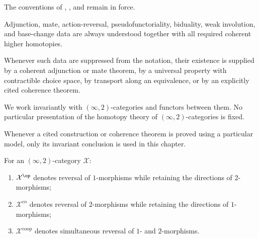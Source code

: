 The conventions of
,
,
and
remain in force.

\begin{convention}
\label{conv:rigid-morita-higher-coherence}
Adjunction, mate, action-reversal, pseudofunctoriality, biduality, weak
involution, and base-change data are always understood together with all
required coherent higher homotopies.

Whenever such data are suppressed from the notation, their existence is
supplied by a coherent adjunction or mate theorem, by a universal property
with contractible choice space, by transport along an equivalence, or by
an explicitly cited coherence theorem.
\end{convention}

\begin{convention}
\label{conv:infinity-two-variance}
We work invariantly with $(\infty,2)$-categories and functors between
them. No particular presentation of the homotopy theory of
$(\infty,2)$-categories is fixed.

Whenever a cited construction or coherence theorem is proved using a
particular model, only its invariant conclusion is used in this chapter.

For an $(\infty,2)$-category $\mathcal X$:
\begin{enumerate}[label=(\roman*)]
    \item $\mathcal X^{\op}$ denotes reversal of $1$-morphisms while
    retaining the directions of $2$-morphisms;

    \item $\mathcal X^{\mathrm{co}}$ denotes reversal of $2$-morphisms
    while retaining the directions of $1$-morphisms;

    \item $\mathcal X^{\mathrm{coop}}$ denotes simultaneous reversal of
    $1$- and $2$-morphisms.
\end{enumerate}
\end{convention}

